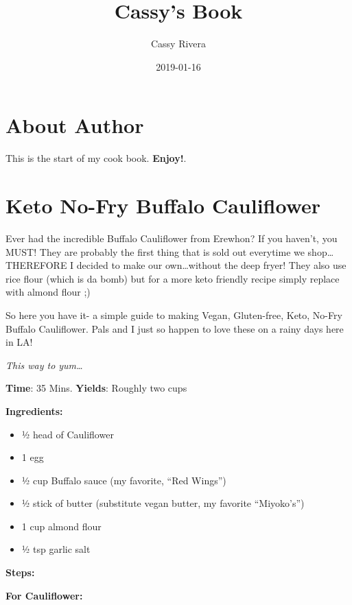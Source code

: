 \documentclass[]{book}
\title{Cassy's Book}
\author{Cassy Rivera}
\date{2019-01-16}
\providecommand{\tightlist}{%
  \setlength{\itemsep}{0pt}\setlength{\parskip}{0pt}}
\begin{document}
\maketitle

{
\setcounter{tocdepth}{1}
\tableofcontents
}
\chapter{About Author}\label{about-author}

This is the start of my cook book. \textbf{Enjoy!}.

\chapter{Keto No-Fry Buffalo Cauliflower}\label{intro}

Ever had the incredible Buffalo Cauliflower from Erewhon? If you
haven't, you MUST! They are probably the first thing that is sold out
everytime we shop\ldots{}THEREFORE I decided to make our
own\ldots{}without the deep fryer! They also use rice flour (which is da
bomb) but for a more keto friendly recipe simply replace with almond
flour ;)

So here you have it- a simple guide to making Vegan, Gluten-free, Keto,
No-Fry Buffalo Cauliflower. Pals and I just so happen to love these on a
rainy days here in LA!

\emph{This way to yum\ldots{}}

\textbf{\textbf{Time}}: 35 Mins. \textbf{\textbf{Yields}}: Roughly two
cups

\textbf{\textbf{Ingredients:}}

\begin{itemize}
\tightlist
\item
  ½ head of Cauliflower
\item
  1 egg
\item
  ½ cup Buffalo sauce (my favorite, ``Red Wings'')
\item
  ½ stick of butter (substitute vegan butter, my favorite ``Miyoko's'')
\item
  1 cup almond flour
\item
  ½ tsp garlic salt
\end{itemize}

\textbf{\textbf{Steps:}}

\textbf{For Cauliflower:}
\end{document}

